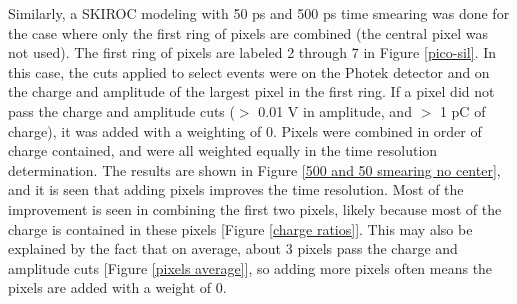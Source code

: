 \documentclass[twocolumn,aps,prd,reprint]{revtex4-1}
\begin{document}
Similarly, a SKIROC modeling with 50 ps and 500 ps time smearing was done for the case where only the first ring of pixels are combined (the central pixel was not used). The first ring of pixels are labeled 2 through 7 in Figure \ref{pico-sil}. In this case, the cuts applied to select events were on the Photek detector and on the charge and amplitude of the largest pixel in the first ring. If a pixel did not pass the charge and amplitude cuts ($>$ 0.01 V in amplitude, and $>$ 1 pC of charge), it was added with a weighting of 0. Pixels were combined in order of charge contained, and were all weighted equally in the time resolution determination. The results are shown in Figure \ref{500 and 50 smearing no center}, and it is seen that adding pixels improves the time resolution. Most of the improvement is seen in combining the first two pixels, likely because most of the charge is contained in these pixels [Figure \ref{charge ratios}]. This may also be explained by the fact that on average, about 3 pixels pass the charge and amplitude cuts [Figure \ref{pixels average}], so adding more pixels often means the pixels are added with a weight of 0.
\end{document}
